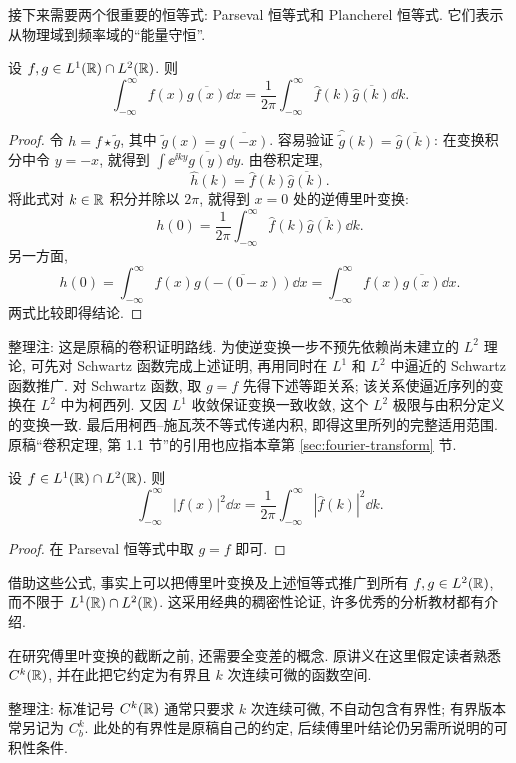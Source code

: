 接下来需要两个很重要的恒等式: Parseval 恒等式和 Plancherel 恒等式. 它们表示从物理域到频率域的“能量守恒”.

\begin{theorem}\label{thm:parseval}
设 $f,g\in L^1(\mathbb R)\cap L^2(\mathbb R)$. 则
\[
\int_{-\infty}^{\infty}f(x)\overline{g(x)}\dd x
=\frac1{2\pi}\int_{-\infty}^{\infty}
\widehat f(k)\overline{\widehat g(k)}\dd k.
\]
\end{theorem}
\begin{proof}
令 $h=f\star\widetilde g$, 其中 $\widetilde g(x)=\overline{g(-x)}$. 容易验证 $\widehat{\widetilde g}(k)=\overline{\widehat g(k)}$: 在变换积分中令 $y=-x$, 就得到 $\int\ee^{\ii ky}\overline{g(y)}\dd y$. 由卷积定理,
\[
\widehat h(k)=\widehat f(k)\overline{\widehat g(k)}.
\]
将此式对 $k\in\mathbb R$ 积分并除以 $2\pi$, 就得到 $x=0$ 处的逆傅里叶变换:
\[
h(0)=\frac1{2\pi}\int_{-\infty}^{\infty}
\widehat f(k)\overline{\widehat g(k)}\dd k.
\]
另一方面,
\[
h(0)=\int_{-\infty}^{\infty}f(x)\overline{g(-(0-x))}\dd x
=\int_{-\infty}^{\infty}f(x)\overline{g(x)}\dd x.
\]
两式比较即得结论.
\end{proof}
\begin{remark}
整理注: 这是原稿的卷积证明路线. 为使逆变换一步不预先依赖尚未建立的 $L^2$ 理论, 可先对 Schwartz 函数完成上述证明, 再用同时在 $L^1$ 和 $L^2$ 中逼近的 Schwartz 函数推广. 对 Schwartz 函数, 取 $g=f$ 先得下述等距关系; 该关系使逼近序列的变换在 $L^2$ 中为柯西列. 又因 $L^1$ 收敛保证变换一致收敛, 这个 $L^2$ 极限与由积分定义的变换一致. 最后用柯西--施瓦茨不等式传递内积, 即得这里所列的完整适用范围. 原稿“卷积定理, 第 1.1 节”的引用也应指本章第 \ref{sec:fourier-transform} 节.
\end{remark}

\begin{theorem}\label{thm:plancherel}
设 $f\in L^1(\mathbb R)\cap L^2(\mathbb R)$. 则
\[
\int_{-\infty}^{\infty}|f(x)|^2\dd x
=\frac1{2\pi}\int_{-\infty}^{\infty}|\widehat f(k)|^2\dd k.
\]
\end{theorem}
\begin{proof}
在 Parseval 恒等式中取 $g=f$ 即可.
\end{proof}

借助这些公式, 事实上可以把傅里叶变换及上述恒等式推广到所有 $f,g\in L^2(\mathbb R)$, 而不限于 $L^1(\mathbb R)\cap L^2(\mathbb R)$. 这采用经典的稠密性论证, 许多优秀的分析教材都有介绍.

在研究傅里叶变换的截断之前, 还需要全变差的概念. 原讲义在这里假定读者熟悉 $C^k(\mathbb R)$, 并在此把它约定为有界且 $k$ 次连续可微的函数空间.
\begin{remark}
整理注: 标准记号 $C^k(\mathbb R)$ 通常只要求 $k$ 次连续可微, 不自动包含有界性; 有界版本常另记为 $C_b^k$. 此处的有界性是原稿自己的约定, 后续傅里叶结论仍另需所说明的可积性条件.
\end{remark}

